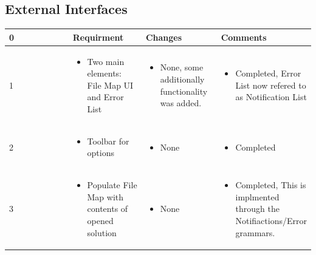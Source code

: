 \documentclass[letterpaper,10pt,titlepage,draftclsnofoot,onecolumn,onesided] {IEEEtran}
\begin{document}
\subsection{External Interfaces}
\small{
\begin{center}
	\begin{singlespace}
		\begin{tabular}{ |  p{0.25\linewidth}  |  p{0.25\linewidth}  | p{0.25\linewidth} | p{0.25\linewidth} |}
		\hline
		0 & Requirment & Changes & Comments \\ \hline
		
			1
		& 
			\begin{itemize}
				\item Two main elements: File Map UI and Error List
			\end{itemize}
		& 
			\begin{itemize}
				\item None, some additionally functionality was added.
			\end{itemize}
		&
			\begin{itemize}
				\item Completed, Error List now refered to as Notification List
			\end{itemize} 
		
        \\ \hline

			2
		& 
			\begin{itemize}
				\item Toolbar for options
			\end{itemize}
		& 
			\begin{itemize}
				\item None
			\end{itemize}
		&
			\begin{itemize}
				\item Completed
			\end{itemize} 
		
        \\ \hline

            3
		& 
			\begin{itemize}
				\item Populate File Map with contents of opened solution
			\end{itemize}
		& 
			\begin{itemize}
				\item None
			\end{itemize}
		&
			\begin{itemize}
				\item Completed, This is implmented through the Notifiactions/Error grammars.
			\end{itemize} 
		

\end{tabular}
\end{singlespace}
\end{center}}
\end{document}

